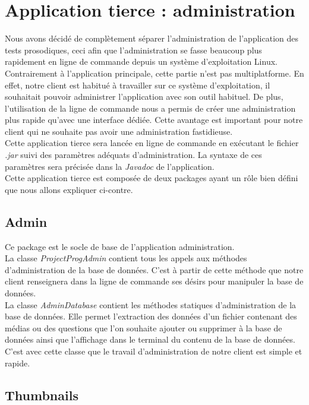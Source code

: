 \section{Application tierce : administration}

Nous avons décidé de complètement séparer l'administration de l'application des tests prosodiques, ceci afin que l'administration se fasse beaucoup plus rapidement en ligne de commande depuis un système d'exploitation Linux. Contrairement à l'application principale, cette partie n'est pas multiplatforme. En effet, notre client est habitué à travailler sur ce système d'exploitation, il souhaitait pouvoir administrer l'application avec son outil habituel. De plus, l'utilisation de la ligne de commande nous a permis de créer une administration plus rapide qu'avec une interface dédiée. Cette avantage est important pour notre client qui ne souhaite pas avoir une administration fastidieuse.\\

Cette application tierce sera lancée en ligne de commande en exécutant le fichier \textit{.jar} suivi des paramètres adéquats d'administration. La syntaxe de ces paramètres sera précisée dans la \textit{Javadoc} de l'application.\\

Cette application tierce est composée de deux packages ayant un rôle bien défini que nous allons expliquer ci-contre.

\subsection{Admin}

Ce package est le socle de base de l'application administration.\\
La classe \textit{ProjectProgAdmin} contient tous les appels aux méthodes d'administration de la base de données. C'est à partir de cette méthode que notre client renseignera dans la ligne de commande ses désirs pour manipuler la base de données.\\
La classe \textit{AdminDatabase} contient les méthodes statiques d'administration de la base de données. Elle permet l'extraction des données d'un fichier contenant des médias ou des questions que l'on souhaite ajouter ou supprimer à la base de données ainsi que l'affichage dans le terminal du contenu de la base de données. C'est avec cette classe que le travail d'administration de notre client est simple et rapide.

\subsection{Thumbnails}

